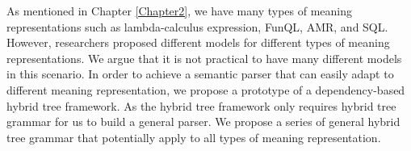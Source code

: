 As mentioned in Chapter \ref{Chapter2}, we have many types of meaning representations such as lambda-calculus expression, FunQL, AMR, and SQL. 
However, researchers proposed different models for different types of meaning representations. 
We argue that it is not practical to have many different models in this scenario. 
In order to achieve a semantic parser that can easily adapt to different meaning representation, we propose a prototype of a dependency-based hybrid tree framework.
As the hybrid tree framework only requires hybrid tree grammar for us to build a general parser. 
We propose a series of general hybrid tree grammar that potentially apply to all types of meaning representation.

